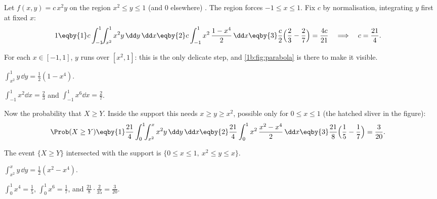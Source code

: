 \label{1b:ex:parabola}
Let $f(x,y)=c\,x^2y$ on the region $x^2\le y\le1$ (and 0 elsewhere)
. The region forces $-1\le x\le1$. Fix $c$ by
normalisation, integrating $y$ first at fixed $x$:
\begin{align*}
  1
  &\eqby{1} c\int_{-1}^{1}\!\!\int_{x^2}^{1}x^2y\,\dd y\,\dd x
   \eqby{2} c\int_{-1}^{1}x^2\,\frac{1-x^4}{2}\,\dd x
   \eqby{3} \frac c2\Bigl(\frac23-\frac27\Bigr)
   = \frac{4c}{21}
  \quad\Longrightarrow\quad c=\frac{21}{4}.
\end{align*}
\begin{explain}
  \item For each $x\in[-1,1]$, $y$ runs over $[x^2,1]$: this is the only
        delicate step, and \cref{1b:fig:parabola} is there to make it visible.
  \item $\int_{x^2}^1y\,\dd y=\tfrac12(1-x^4)$.
  \item $\int_{-1}^1x^2\dd x=\tfrac23$ and $\int_{-1}^1x^6\dd x=\tfrac27$.
\end{explain}
Now the probability that $X\ge Y$. Inside the support this needs $x\ge y\ge x^2$,
possible only for $0\le x\le1$ (the hatched sliver in the figure):
\begin{align*}
  \Prob(X\ge Y)
  &\eqby{1} \frac{21}{4}\int_0^1\!\!\int_{x^2}^{x}x^2y\,\dd y\,\dd x
   \eqby{2} \frac{21}{4}\int_0^1x^2\,\frac{x^2-x^4}{2}\,\dd x
   \eqby{3} \frac{21}{8}\Bigl(\frac15-\frac17\Bigr)
   = \frac{3}{20}.
\end{align*}
\begin{explain}
  \item The event $\{X\ge Y\}$ intersected with the support is
        $\{0\le x\le1,\ x^2\le y\le x\}$.
  \item $\int_{x^2}^{x}y\,\dd y=\tfrac12(x^2-x^4)$.
  \item $\int_0^1x^4=\tfrac15$, $\int_0^1x^6=\tfrac17$, and
        $\tfrac{21}{8}\cdot\tfrac{2}{35}=\tfrac{3}{20}$.
\end{explain}


